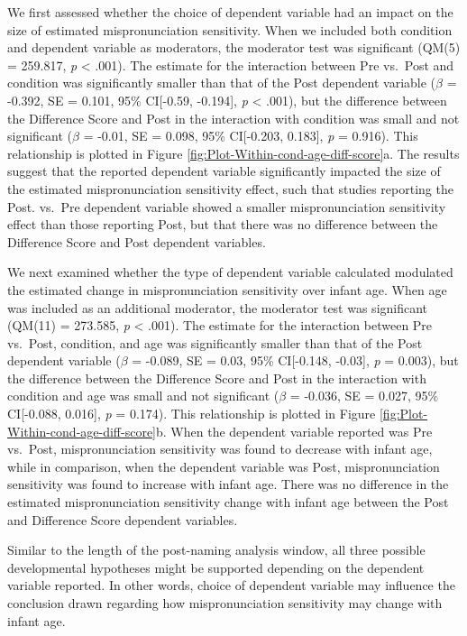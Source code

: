 \documentclass[man]{apa6}
\theoremstyle{definition}
\theoremstyle{definition}
\theoremstyle{definition}
\theoremstyle{remark}
\begin{document}
We first assessed whether the choice of dependent variable had an impact
on the size of estimated mispronunciation sensitivity. When we included
both condition and dependent variable as moderators, the moderator test
was significant (QM(5) = 259.817, \emph{p} \textless{} .001). The
estimate for the interaction between Pre vs.~Post and condition was
significantly smaller than that of the Post dependent variable
(\(\beta\) = -0.392, SE = 0.101, 95\% CI{[}-0.59, -0.194{]}, \emph{p}
\textless{} .001), but the difference between the Difference Score and
Post in the interaction with condition was small and not significant
(\(\beta\) = -0.01, SE = 0.098, 95\% CI{[}-0.203, 0.183{]}, \emph{p} =
0.916). This relationship is plotted in Figure
\ref{fig:Plot-Within-cond-age-diff-score}a. The results suggest that the
reported dependent variable significantly impacted the size of the
estimated mispronunciation sensitivity effect, such that studies
reporting the Post. vs.~Pre dependent variable showed a smaller
mispronunciation sensitivity effect than those reporting Post, but that
there was no difference between the Difference Score and Post dependent
variables.

We next examined whether the type of dependent variable calculated
modulated the estimated change in mispronunciation sensitivity over
infant age. When age was included as an additional moderator, the
moderator test was significant (QM(11) = 273.585, \emph{p} \textless{}
.001). The estimate for the interaction between Pre vs.~Post, condition,
and age was significantly smaller than that of the Post dependent
variable (\(\beta\) = -0.089, SE = 0.03, 95\% CI{[}-0.148, -0.03{]},
\emph{p} = 0.003), but the difference between the Difference Score and
Post in the interaction with condition and age was small and not
significant (\(\beta\) = -0.036, SE = 0.027, 95\% CI{[}-0.088, 0.016{]},
\emph{p} = 0.174). This relationship is plotted in Figure
\ref{fig:Plot-Within-cond-age-diff-score}b. When the dependent variable
reported was Pre vs.~Post, mispronunciation sensitivity was found to
decrease with infant age, while in comparison, when the dependent
variable was Post, mispronunciation sensitivity was found to increase
with infant age. There was no difference in the estimated
mispronunciation sensitivity change with infant age between the Post and
Difference Score dependent variables.

Similar to the length of the post-naming analysis window, all three
possible developmental hypotheses might be supported depending on the
dependent variable reported. In other words, choice of dependent
variable may influence the conclusion drawn regarding how
mispronunciation sensitivity may change with infant age.
\end{document}
